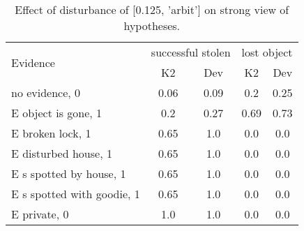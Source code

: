 \begin{table}\begin{tabular}{l|cc|cc}\toprule\multirow{2}{*}{Evidence} & \multicolumn{2}{c}{successful stolen}& \multicolumn{2}{c}{lost object}\\& {K2} & {Dev}& {K2} & {Dev}\\\midrule
no evidence, 0 & 0.06&0.09&0.2&0.25\\E object is gone, 1 & \cellcolor{Bittersweet}0.2&\cellcolor{Bittersweet}0.27&0.69&0.73\\E broken lock, 1 & \cellcolor{Bittersweet}0.65&\cellcolor{Bittersweet}1.0&0.0&0.0\\E disturbed house, 1 & \cellcolor{Bittersweet}0.65&\cellcolor{Bittersweet}1.0&0.0&0.0\\E s spotted by house, 1 & \cellcolor{Bittersweet}0.65&\cellcolor{Bittersweet}1.0&0.0&0.0\\E s spotted with goodie, 1 & \cellcolor{Bittersweet}0.65&\cellcolor{Bittersweet}1.0&0.0&0.0\\E private, 0 & 1.0&1.0&0.0&0.0\\\bottomrule\end{tabular}\caption{Effect of disturbance of [0.125, 'arbit'] on strong view of hypotheses.}\end{table}